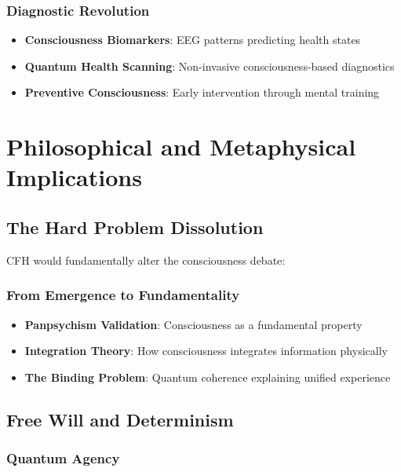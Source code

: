 \documentclass[12pt,article]{memoir}
\begin{document}
\subsection{Diagnostic Revolution}

\begin{itemize}
    \item \textbf{Consciousness Biomarkers}: EEG patterns predicting health states
    \item \textbf{Quantum Health Scanning}: Non-invasive consciousness-based diagnostics
    \item \textbf{Preventive Consciousness}: Early intervention through mental training
\end{itemize}

\chapter{Philosophical and Metaphysical Implications}

\section{The Hard Problem Dissolution}

CFH would fundamentally alter the consciousness debate:

\subsection{From Emergence to Fundamentality}

\begin{itemize}
    \item \textbf{Panpsychism Validation}: Consciousness as a fundamental property
    \item \textbf{Integration Theory}: How consciousness integrates information physically
    \item \textbf{The Binding Problem}: Quantum coherence explaining unified experience
\end{itemize}

\section{Free Will and Determinism}

\subsection{Quantum Agency}
\end{document}

